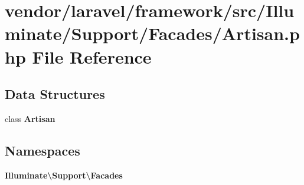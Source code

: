 \section{vendor/laravel/framework/src/\+Illuminate/\+Support/\+Facades/\+Artisan.php File Reference}
\label{_artisan_8php}
\subsection*{Data Structures}
\begin{DoxyCompactItemize}
\item 
class {\bf Artisan}
\end{DoxyCompactItemize}
\subsection*{Namespaces}
\begin{DoxyCompactItemize}
\item 
 {\bf Illuminate\textbackslash{}\+Support\textbackslash{}\+Facades}
\end{DoxyCompactItemize}
